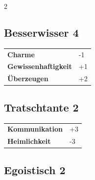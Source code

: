 \begin{multicols}{2}
\begin{tcolorbox}

\end{tcolorbox}

\begin{tcolorbox}
    \subsection*{Besserwisser \hfill \small{4 }}
    \tcblower




\begin{tabular}{@{}ll@{}}
    \textbf{Charme} & -1\\
    \textbf{Gewissenhaftigkeit} & +1\\
    \textbf{Überzeugen} & +2\\
\end{tabular}


\end{tcolorbox}

\begin{tcolorbox}
    \subsection*{Tratschtante \hfill \small{2 }}
    \tcblower




\begin{tabular}{@{}ll@{}}
    \textbf{Kommunikation} & +3\\
    \textbf{Heimlichkeit} & -3\\
\end{tabular}


\end{tcolorbox}

\begin{tcolorbox}
    \subsection*{Egoistisch \hfill \small{2 }}
    \tcblower





\end{tcolorbox}
\end{multicols}
